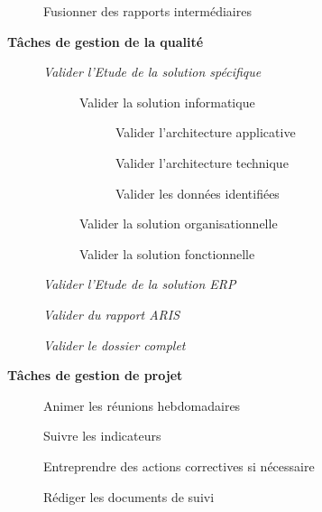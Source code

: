 \begin{description}
\begin{description}
                \begin{description}
                    \item[\textbullet] Fusionner des rapports intermédiaires
                \end{description}
        \end{description}
    \item[] \bf{Tâches de gestion de la qualité}
        \begin{description}
            \item[\textbullet] \it{Valider l'Etude de la solution spécifique}
                \begin{description}
                    \item[\textbullet] Valider la solution informatique
                        \begin{description}
                            \item[\textbullet] Valider l'architecture applicative
                            \item[\textbullet] Valider l'architecture technique
                            \item[\textbullet] Valider les données identifiées
                        \end{description}
                    \item[\textbullet] Valider la solution organisationnelle
                    \item[\textbullet] Valider la solution fonctionnelle
                \end{description}
            \item[\textbullet] \it{Valider l'Etude de la solution ERP}
            \item[\textbullet] \it{Valider du rapport ARIS}
            \item[\textbullet] \it{Valider le dossier complet}
        \end{description}
    \item[] \bf{Tâches de gestion de projet}
        \begin{description}
            \item[\textbullet] Animer les réunions hebdomadaires
            \item[\textbullet] Suivre les indicateurs
            \item[\textbullet] Entreprendre des actions correctives si nécessaire 
            \item[\textbullet] Rédiger les documents de suivi
        \end{description}
\end{description}

